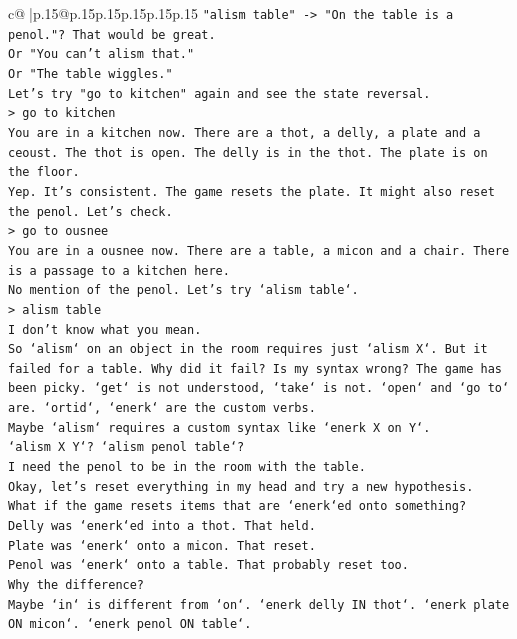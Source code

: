 \documentclass{article}
\begin{document}
{\begin{supertabular}{c@{$\;$}|p{.15\linewidth}@{}p{.15\linewidth}p{.15\linewidth}p{.15\linewidth}p{.15\linewidth}p{.15\linewidth}}
{{{\texttt{"alism table" {-}> "On the table is a penol."? That would be great.} \\
\texttt{Or "You can't alism that."} \\
\texttt{Or "The table wiggles."} \\
\texttt{Let's try "go to kitchen" again and see the state reversal.} \\
\texttt{> go to kitchen} \\
\texttt{You are in a kitchen now. There are a thot, a delly, a plate and a ceoust. The thot is open. The delly is in the thot. The plate is on the floor.} \\
\texttt{Yep. It's consistent. The game resets the plate. It might also reset the penol. Let's check.} \\
\texttt{> go to ousnee} \\
\texttt{You are in a ousnee now. There are a table, a micon and a chair. There is a passage to a kitchen here.} \\
\texttt{No mention of the penol. Let's try `alism table`.} \\
\texttt{> alism table} \\
\texttt{I don't know what you mean.} \\
\texttt{So `alism` on an object in the room requires just `alism X`. But it failed for a table. Why did it fail? Is my syntax wrong? The game has been picky. `get` is not understood, `take` is not. `open` and `go to` are. `ortid`, `enerk` are the custom verbs.} \\
\texttt{Maybe `alism` requires a custom syntax like `enerk X on Y`.} \\
\texttt{`alism X Y`? `alism penol table`?} \\
\texttt{I need the penol to be in the room with the table.} \\
\texttt{Okay, let's reset everything in my head and try a new hypothesis.} \\
\texttt{What if the game resets items that are `enerk`ed onto something?} \\
\texttt{Delly was `enerk`ed into a thot. That held.} \\
\texttt{Plate was `enerk` onto a micon. That reset.} \\
\texttt{Penol was `enerk` onto a table. That probably reset too.} \\
\texttt{Why the difference?} \\
\texttt{Maybe `in` is different from `on`. `enerk delly IN thot`. `enerk plate ON micon`. `enerk penol ON table`.} \\
}}}
\end{supertabular}}
\end{document}
